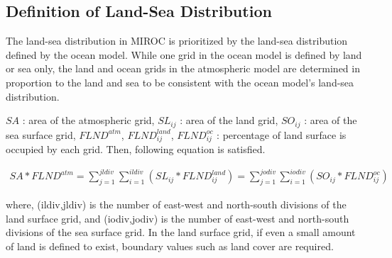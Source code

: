 \hypertarget{definition-of-land-sea-distribution}{%
\subsection{Definition of Land-Sea Distribution}\label{definition-of-land-sea-distribution}}

The land-sea distribution in MIROC is prioritized by the land-sea distribution defined by the ocean model. While one grid in the ocean model is defined by land or sea only, the land and ocean grids in
the atmospheric model are determined in proportion to the land and sea to be consistent with the ocean model's land-sea distribution.

\(SA\) : area of the atmospheric grid, \(SL _ {ij}\) : area of the land grid, \(SO _ {ij}\) : area of the sea surface grid, \(FLND^{atm}\), \(FLND^{land} _ {ij}\), \(FLND^{oc} _ {ij}\) : percentage of
land surface is occupied by each grid. Then, following equation is satisfied.

\begin{eqnarray} SA*FLND^{atm} = \sum _ {j=1}^{jldiv}\sum _ {i=1}^{ildiv}(SL _ {ij}*FLND^{land} _ {ij}) = \sum _ {j=1}^{jodiv}\sum _ {i=1}^{iodiv}(SO _ {ij}*FLND^{oc } _{ij}) \end{eqnarray}

where, (ildiv,jldiv) is the number of east-west and north-south divisions of the land surface grid, and (iodiv,jodiv) is the number of east-west and north-south divisions of the sea surface grid. In
the land surface grid, if even a small amount of land is defined to exist, boundary values such as land cover are required.
